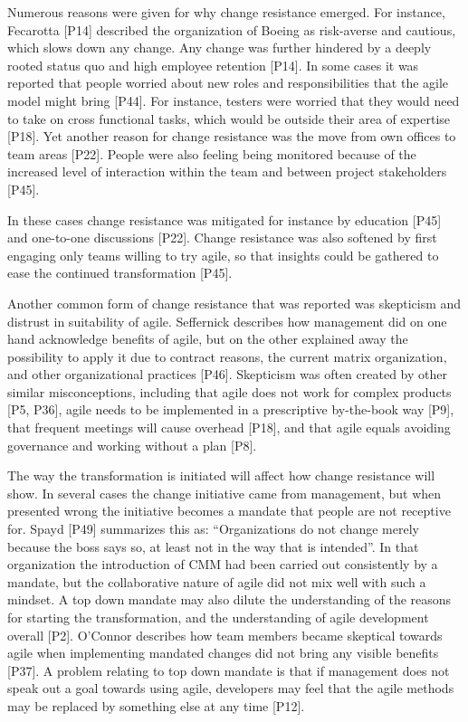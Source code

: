 \documentclass[preprint,authoryear,12pt]{elsarticle}
\begin{document}
Numerous reasons were given for why change resistance emerged. For
instance, Fecarotta [P14] described the organization of Boeing as risk-averse
and cautious, which slows down any change. Any change was further hindered by a
deeply rooted status quo and high employee retention [P14]. In some cases it was
reported that people worried about new roles and responsibilities that the agile
model might bring [P44]. For instance, testers were worried that they would need
to take on cross functional tasks, which would be outside their area of
expertise [P18]. Yet another reason for change resistance was the move from own
offices to team areas [P22]. People were also feeling being monitored because of
the increased level of interaction within the team and between project
stakeholders [P45].

In these cases change resistance was mitigated for instance by education [P45]
and one-to-one discussions [P22]. Change resistance was also softened by first
engaging only teams willing to try agile, so that insights could be gathered to
ease the continued transformation [P45].

Another common form of change resistance that was reported was skepticism and
distrust in suitability of agile. Seffernick describes how management did on one hand
acknowledge benefits of agile, but on the other explained away the possibility
to apply it due to contract reasons, the current matrix organization, and other
organizational practices [P46]. Skepticism was often created by other similar
misconceptions, including that agile does not work for complex products [P5,
P36], agile needs to be implemented in a prescriptive by-the-book way [P9], that
frequent meetings will cause overhead [P18], and that agile equals avoiding
governance and working without a plan [P8].




The way the transformation is initiated will affect how change resistance will
show. In several cases the change initiative came from management, but when
presented wrong the initiative becomes a mandate that people are not receptive
for. Spayd [P49] summarizes this as: ``Organizations do not change merely
because the boss says so, at least not in the way that is intended''. In that
organization the introduction of CMM had been carried out consistently by a
mandate, but the collaborative nature of agile did not mix well with such a
mindset. A top down mandate may also dilute the understanding of the reasons for
starting the transformation, and the understanding of agile development overall
[P2]. O'Connor describes how team members became skeptical towards agile when
implementing mandated changes did not bring any visible benefits [P37].
A problem relating to top down mandate is that if management does not speak out
a goal towards using agile, developers may feel that the agile methods may be
replaced by something else at any time [P12].
\end{document}
